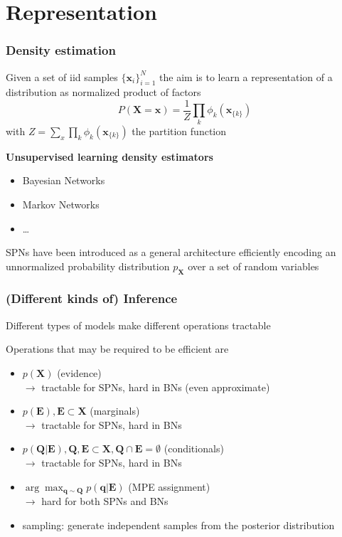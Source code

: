 \documentclass[10pt, t, xcolor={usenames,dvipsnames,svgnames}, compress]{beamer}
\begin{document}
\section{Representation}
{
  \begin{frame}[c]
    \sectionpage
  \end{frame}
}

\begin{frame}
  \frametitle{Density estimation}

Given a set of iid samples $\{\mathbf x_i\}_{i=1}^N$ the aim is to learn a
representation of a distribution as normalized product of factors
$$P(\mathbf X = \mathbf x) = \frac{1}{Z}\prod_k \phi_k(\mathbf x_{\{k\}})$$
with $Z = \sum_x\prod_k \phi_k(\mathbf x_{\{k\}})$ the partition function

\vskip 0.5cm

{\color{violet} \textbf{Unsupervised learning density estimators}}
\begin{itemize}
  \item Bayesian Networks
  \item Markov Networks
  \item \ldots
\end{itemize}

SPNs have been introduced as a general architecture efficiently encoding an
unnormalized probability distribution $p_{\mathbf X}$ over a set of random 
variables


\end{frame}

\begin{frame}
  \frametitle{(Different kinds of) Inference}
  Different types of models make different operations tractable

\vskip 10pt

Operations that may be required to be efficient are
  \begin{itemize}
  \item $p(\mathbf{X})$ (evidence)\\
    \hfill {\color{violet} $\rightarrow$ tractable for SPNs, hard in BNs (even approximate)}
  \item $p(\mathbf{E}), \mathbf{E}\subset\mathbf{X}$ (marginals)\\
    \hfill {\color{violet} $\rightarrow$ tractable for SPNs, hard in BNs}
  \item $p(\mathbf{Q}|\mathbf{E}), \mathbf{Q},
    \mathbf{E}\subset\mathbf{X}, \mathbf{Q}\cap \mathbf{E}=\emptyset$
    (conditionals)\\
    \hfill \hfill {\color{violet} $\rightarrow$ tractable for SPNs, hard in BNs}
  \item
    $\arg\max_{\mathbf{q}\sim\mathbf{Q}}p(\mathbf{q}|\mathbf{E})$
    (MPE assignment)\\
    \hfill {\color{violet} $\rightarrow$ hard for both SPNs and BNs}
    \item sampling: generate independent samples from the posterior distribution
  \end{itemize}
\end{frame}
\end{document}
